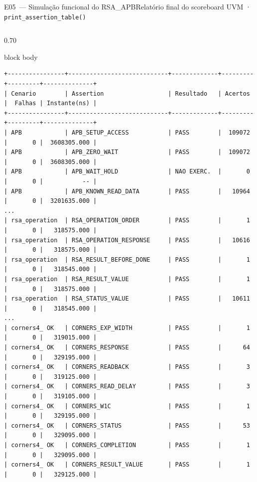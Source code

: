\documentclass[aspectratio=169,10pt,t]{beamer}
\begin{document}
\begin{frame}[fragile]{E05~— Simulação funcional do RSA\_APB}{Relatório final do scoreboard UVM · \texttt{print\_assertion\_table()}}
  \vspace*{-0.3cm}
  \begin{columns}[T]
    \begin{column}{0.70\textwidth}
      \tiny
      \begin{beamercolorbox}[rounded=true,shadow=false,sep=3pt]{block body}
\vspace*{-0.6\baselineskip}
\fontsize{4.7}{5.5}\selectfont
\begin{verbatim}
+----------------+----------------------------+-------------+---------+---------+--------------+
| Cenario        | Assertion                  | Resultado   | Acertos |  Falhas | Instante(ns) |
+----------------+----------------------------+-------------+---------+---------+--------------+
| APB            | APB_SETUP_ACCESS           | PASS        |  109072 |       0 |  3608305.000 |
| APB            | APB_ZERO_WAIT              | PASS        |  109072 |       0 |  3608305.000 |
| APB            | APB_WAIT_HOLD              | NAO EXERC.  |       0 |       0 |           -- |
| APB            | APB_KNOWN_READ_DATA        | PASS        |   10964 |       0 |  3201635.000 |
...
| rsa_operation  | RSA_OPERATION_ORDER        | PASS        |       1 |       0 |   318575.000 |
| rsa_operation  | RSA_OPERATION_RESPONSE     | PASS        |   10616 |       0 |   318575.000 |
| rsa_operation  | RSA_RESULT_BEFORE_DONE     | PASS        |       1 |       0 |   318545.000 |
| rsa_operation  | RSA_RESULT_VALUE           | PASS        |       1 |       0 |   318575.000 |
| rsa_operation  | RSA_STATUS_VALUE           | PASS        |   10611 |       0 |   318545.000 |
...
| corners4_ OK   | CORNERS_EXP_WIDTH          | PASS        |       1 |       0 |   319015.000 |
| corners4_ OK   | CORNERS_RESPONSE           | PASS        |      64 |       0 |   329195.000 |
| corners4_ OK   | CORNERS_READBACK           | PASS        |       3 |       0 |   319125.000 |
| corners4_ OK   | CORNERS_READ_DELAY         | PASS        |       3 |       0 |   319105.000 |
| corners4_ OK   | CORNERS_W1C                | PASS        |       1 |       0 |   329195.000 |
| corners4_ OK   | CORNERS_STATUS             | PASS        |      53 |       0 |   329095.000 |
| corners4_ OK   | CORNERS_COMPLETION         | PASS        |       1 |       0 |   329095.000 |
| corners4_ OK   | CORNERS_RESULT_VALUE       | PASS        |       1 |       0 |   329125.000 |

\end{verbatim}
\end{beamercolorbox}
\end{column}
\end{columns}
\end{frame}
\end{document}
